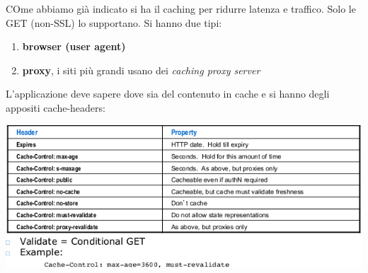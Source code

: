 \documentclass[a4paper,12pt, oneside]{book}
\begin{document}
COme abbiamo già indicato si ha il caching per ridurre latenza e traffico. Solo le GET (non-SSL) lo supportano. Si hanno due tipi:
\begin{enumerate}
\item \textbf{browser (user agent)}
\item \textbf{proxy}, i siti più grandi usano dei \textit{caching proxy server}
\end{enumerate}
\newpage
L'applicazione deve sapere dove sia del contenuto in cache e si hanno degli appositi cache-headers:
\begin{center}
  \includegraphics[scale=0.7]{img/cachehead.png}
\end{center}
\end{document}
